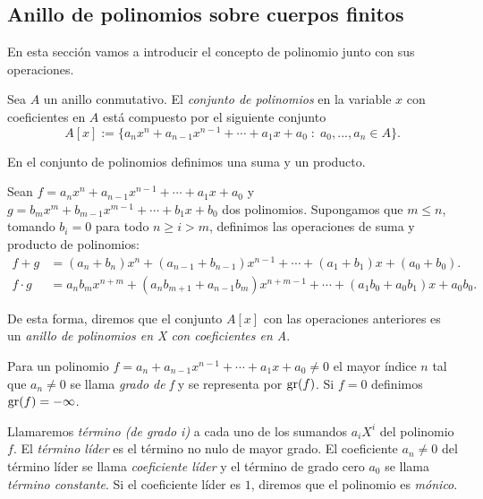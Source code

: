 

\subsection{Anillo de polinomios sobre cuerpos finitos}

En esta sección vamos a introducir el concepto de polinomio junto con sus operaciones.

\begin{definition}
    Sea $A$ un anillo conmutativo. El \emph{conjunto de polinomios} en la variable $x$ con coeficientes en $A$ está compuesto por el siguiente conjunto
    \[
        A[x] := \{ a_n x^n  + a_{n-1} x^{n-1} + \cdots + a_1 x + a_0 \; : \; a_0, ..., a_n \in A \}. 
    \]
\end{definition}

En el conjunto de polinomios definimos una suma y un producto. 

Sean $f = a_n x^n + a_{n-1} x^{n-1} + \cdots + a_1 x + a_0$ y $g = b_m x^m + b_{m-1} x^{m-1} + \cdots + b_1 x + b_0$ dos polinomios. Supongamos que $m \leq n$, tomando $b_i = 0$ para todo $n \geq i > m$, definimos las operaciones de suma y producto de polinomios:
\begin{align*}
    f + g       &= (a_n + b_n)x^n + (a_{n-1} + b_{n-1})x^{n-1} + \cdots + (a_1 + b_1)x + (a_0 + b_0).\\
    f \cdot g   &= a_n b_m x^{n+m} + (a_n b_{m+1} + a_{n-1} b_m) x^{n+m-1} + \cdots + (a_1 b_0 + a_0 b_1)x + a_0 b_0.
\end{align*} 

De esta forma, diremos que el conjunto $A[x]$ con las operaciones anteriores es un \emph{anillo de polinomios en X con coeficientes en A}.

\begin{definition}
    Para un polinomio $f = a_n + a_{n-1} x^{n-1} + \cdots + a_1 x + a_0 \neq 0$ el mayor índice $n$ tal que $a_n \neq 0$ se llama \emph{grado de f} y se representa por $\operatorname{gr}(f)$. Si $f = 0$ definimos $\operatorname{gr}(f) = - \infty$.

    Llamaremos \emph{término (de grado i)} a cada uno de los sumandos $a_i X^i$ del polinomio $f$. El \emph{término líder} es el término no nulo de mayor grado. El coeficiente $a_n \neq 0$ del término líder se llama \emph{coeficiente líder} y el término de grado cero $a_0$ se llama \emph{término constante}. Si el coeficiente líder es $1$, diremos que el polinomio es \emph{mónico}.
\end{definition}

